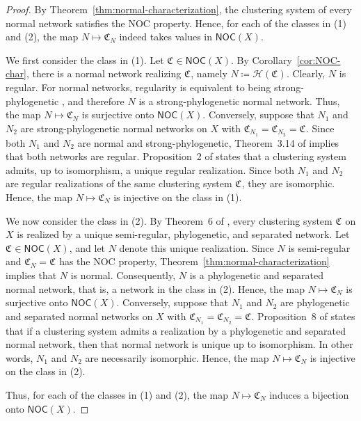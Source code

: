 \documentclass[preprint]{elsarticle}
\newcommand{\CS}[1][]{\ensuremath{\mathfrak{C}_{#1}}}
\newcommand{\Hasse}{\ensuremath{\mathcal{H}}}
\begin{document}
\begin{proof}
By Theorem~\ref{thm:normal-characterization}, the clustering system of every normal network
satisfies the NOC property. Hence, for each of the classes in (1) and (2), the map $ N\mapsto
\CS[N] $ indeed takes values in $\mathsf{NOC}(X)$.

We first consider the class in (1). Let $\CS\in\mathsf{NOC}(X)$. By
Corollary~\ref{cor:NOC-char}, there is a normal network realizing $\CS$, namely
$N\coloneqq\Hasse(\CS)$. Clearly, $N$ is regular. For normal networks,
regularity is equivalent to being strong-phylogenetic \cite[Thm.~3.14]{HLM:26}, and therefore $N$ is
a strong-phylogenetic normal network. Thus, the map $N\mapsto\CS[N]$ is surjective onto
$\mathsf{NOC}(X)$. Conversely, suppose that $N_1$ and $N_2$ are strong-phylogenetic normal networks
on $X$ with $\CS[N_1]=\CS[N_2]=\CS$. Since both $N_1$ and $N_2$ are normal and strong-phylogenetic,
Theorem~3.14 of \cite{HLM:26} implies that both networks are regular.
Proposition~2 of \cite{Hellmuth:2023} states that a clustering system admits, up to isomorphism, a
unique regular realization. Since both $N_1$ and $N_2$ are regular realizations of the same
clustering system $\CS$, they are isomorphic. Hence, the map $N\mapsto\CS[N]$ is injective on the
class in (1).

We now consider the class in (2). By Theorem~6 of \cite{Hellmuth:2023}, every clustering system
$\CS$ on $X$ is realized by a unique semi-regular, phylogenetic, and separated network. Let
$\CS\in\mathsf{NOC}(X)$, and let $N$ denote this unique realization. Since $N$ is semi-regular and
$\CS[N]=\CS$ has the NOC property, Theorem~\ref{thm:normal-characterization} implies that $N$ is
normal. Consequently, $N$ is a phylogenetic and separated normal network, that is, a network in the
class in (2). Hence, the map $N\mapsto\CS[N]$ is surjective onto $\mathsf{NOC}(X)$. Conversely,
suppose that $N_1$ and $N_2$ are phylogenetic and separated normal networks on $X$ with $
\CS[N_1]=\CS[N_2]=\CS$. Proposition~8 of \cite{Hellmuth:2023} states that if a clustering system
admits a realization by a phylogenetic and separated normal network, then that normal network is
unique up to isomorphism. In other words, $N_1$ and $N_2$ are necessarily isomorphic. Hence, the map
$N\mapsto\CS[N]$ is injective on the class in (2).

Thus, for each of the classes in (1) and (2), the map $N\mapsto\CS[N]$ induces a bijection onto
$\mathsf{NOC}(X)$.
\end{proof}
\end{document}
